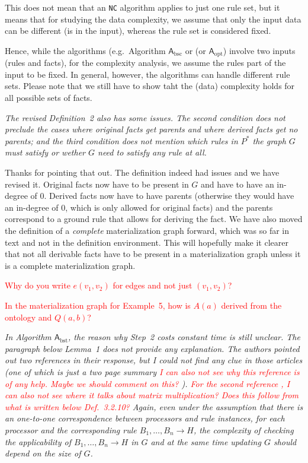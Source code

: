 \documentclass{article}
\let\quoteOld\quote
\let\endquoteOld\endquote
\renewenvironment{quote}{\quoteOld\itshape}{\endquoteOld}
\begin{document}
This does not mean that an \texttt{NC} algorithm applies to just one
rule set, but it means that for studying the data complexity, we
assume that only the input data can be different (is in the input),
whereas the rule set is considered fixed.

Hence, while the algorithms (e.g.\ Algorithm $\mathsf{A}_\text{bsc}$
or (or $\mathsf{A}_\text{opt}$) involve two inputs (rules and facts),
for the complexity analysis, we assume the rules part of the input to
be fixed. In general, however, the algorithms can handle different
rule sets. Please note that we still have to show taht the (data)
complexity holds for all possible sets of facts.

\begin{quote}
  The revised Definition~2 also has some issues. The second condition
  does not preclude the cases where original facts get parents and
  where derived facts get no parents; and the third condition does not
  mention which rules in $P^*$ the graph $G$ must satisfy or wether
  $G$ need to satisfy any rule at all.
\end{quote}

Thanks for pointing that out. The definition indeed had issues and we
have revised it. Original facts now have to be present in $G$ and have
to have an in-degree of $0$. Derived facts now have to have parents
(otherwise they would have an in-degree of $0$, which is only allowed
for original facts) and the parents correspond to a ground rule that
allows for deriving the fact. We have also moved the definition of a
\emph{complete} materialization graph forward, which was so far in
text and not in the definition environment. This will hopefully make
it clearer that not all derivable facts have to be present in a
materialization graph unless it is a complete materialization graph.

\textcolor{red}{Why do you write $e(v_1, v_2)$ for edges and not just
  $(v_1, v_2)$?}

\textcolor{red}{In the materialization graph for Example~5, how is
  $A(a)$ derived from the ontology and $Q(a, b)$? }

\begin{quote}
  In Algorithm $\mathsf{A}_\text{bst}$, the reason why Step~2 costs
  constant time is still unclear. The paragraph below Lemma~1 does not
  provide any explanation. The authors pointed out two references in
  their response, but I could not find any clue in those articles (one
  of which is just a two page summary \textcolor{red}{I can also not
    see why this reference is of any help. Maybe we should comment on
    this? }). \textcolor{red}{For the second reference
    \cite{Raymond95}, I can also not see where it talks about matrix
    multiplication? Does this follow from what is written below
    Def.~3.2.10?} Again, even under the assumption that there is an
  one-to-one correspondence between processors and rule instances, for
  each processor and the corresponding rule $B_1, \ldots, B_n \to H$,
  the complexity of checking the applicability of
  $B_1, \ldots, B_n \to H$ in $G$ and at the same time updating $G$
  should depend on the size of $G$. 
\end{quote}
\end{document}
